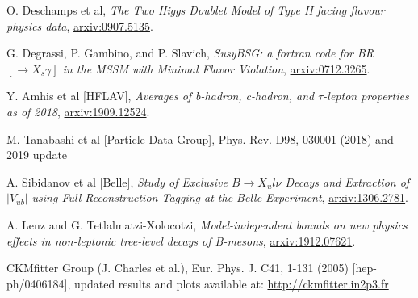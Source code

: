\documentclass[a4paper,12pt]{article}
\begin{document}
\begin{thebibliography}{99}

O. Deschamps et al, \emph{The Two Higgs Doublet Model of Type II facing flavour physics data}, \href{https://arxiv.org/pdf/0907.5135.pdf}{arxiv:0907.5135}.

G. Degrassi, P. Gambino, and P. Slavich, \emph{SusyBSG: a fortran code for BR$[\to X_s\gamma]$ in the MSSM with Minimal Flavor Violation}, \href{https://arxiv.org/pdf/0712.3265.pdf}{arxiv:0712.3265}.

Y. Amhis et al [HFLAV], \emph{Averages of b-hadron, c-hadron, and $\tau$-lepton properties as of 2018}, \href{https://arxiv.org/pdf/1909.12524.pdf}{arxiv:1909.12524}.

M. Tanabashi et al [Particle Data Group], Phys. Rev. D98, 030001 (2018) and 2019 update

A. Sibidanov et al [Belle], \emph{Study of Exclusive $B\to X_ul\nu$ Decays and Extraction of $|V_{ub}|$ using Full Reconstruction Tagging at the Belle Experiment}, \href{https://arxiv.org/pdf/1306.2781.pdf}{arxiv:1306.2781}.

A. Lenz and G. Tetlalmatzi-Xolocotzi, \emph{Model-independent bounds on new physics effects in non-leptonic tree-level decays of B-mesons}, \href{https://arxiv.org/pdf/1912.07621.pdf}{arxiv:1912.07621}.

CKMfitter Group (J. Charles et al.), Eur. Phys. J. C41, 1-131 (2005) [hep-ph/0406184], updated results and plots available at: \href{http://ckmfitter.in2p3.fr}{http://ckmfitter.in2p3.fr}




\end{thebibliography}
\end{document}
